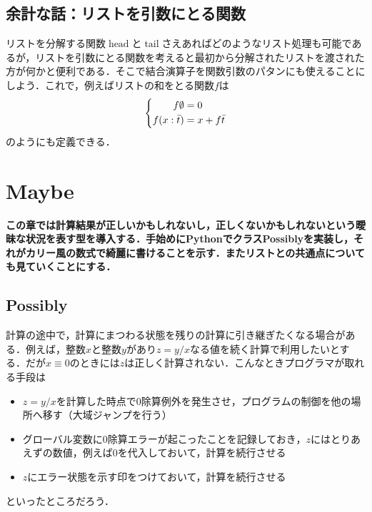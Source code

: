 \documentclass[twocolumn]{jsbook}
\newenvironment{leader}{\begingroup\bf}{\endgroup}
\DeclareMathOperator{\hsklHead}{head}
\DeclareMathOperator{\hsklTail}{tail}
\newcommand{\hsklEmptyList}{\emptyset}
\newcommand{\hsklList}[1]{\Bar{#1}}
\begin{document}
\section{余計な話：リストを引数にとる関数}

リストを分解する関数$\hsklHead$と$\hsklTail$さえあればどのようなリスト処理も可能であるが，リストを引数にとる関数を考えると最初から分解されたリストを渡された方が何かと便利である．そこで結合演算子を関数引数のパタンにも使えることにしよう．これで，例えばリストの和をとる関数$f$は
\begin{equation*}
\left\{
\begin{split}
f\hsklEmptyList&=0\\
f(x:\hsklList{t})&=x+f\hsklList{t}
\end{split}
\right.
\end{equation*}
のようにも定義できる．


\chapter{Maybe}

\begin{leader}
この章では計算結果が正しいかもしれないし，正しくないかもしれないという曖昧な状況を表す型を導入する．手始めにPythonでクラスPossiblyを実装し，それがカリー風の数式で綺麗に書けることを示す．またリストとの共通点についても見ていくことにする．
\end{leader}

\section{Possibly}

計算の途中で，計算にまつわる状態を残りの計算に引き継ぎたくなる場合がある．例えば，整数$x$と整数$y$があり$z=y/x$なる値を続く計算で利用したいとする．だが$x\equiv0$のときには$z$は正しく計算されない．こんなときプログラマが取れる手段は
\begin{itemize}
\item $z=y/x$を計算した時点で$0$除算例外を発生させ，プログラムの制御を他の場所へ移す（大域ジャンプを行う）
\item グローバル変数に$0$除算エラーが起こったことを記録しておき，$z$にはとりあえずの数値，例えば$0$を代入しておいて，計算を続行させる
\item $z$にエラー状態を示す印をつけておいて，計算を続行させる
\end{itemize}
といったところだろう．
\end{document}
